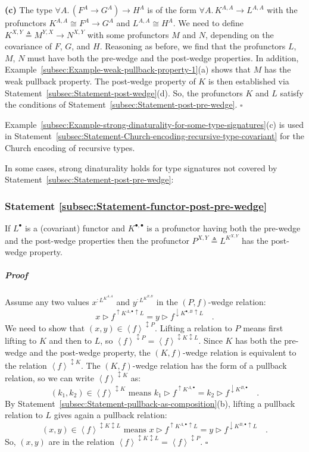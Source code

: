 \textbf{(c)} The type $\forall A.\,(F^{A}\rightarrow G^{A})\rightarrow H^{A}$
is of the form $\forall A.\,K^{A,A}\rightarrow L^{A,A}$ with the
profunctors $K^{A,A}\cong F^{A}\rightarrow G^{A}$ and $L^{A,A}\cong H^{A}$.
We need to define $K^{X,Y}\triangleq M^{Y,X}\rightarrow N^{X,Y}$
with some profunctors $M$ and $N$, depending on the covariance of
$F$, $G$, and $H$. Reasoning as before, we find that the profunctors
$L$, $M$, $N$ must have both the pre-wedge and the post-wedge properties.
In addition, Example~\ref{subsec:Example-weak-pullback-property-1}(a)
shows that $M$ has the weak pullback property. The post-wedge property
of $K$ is then established via Statement~\ref{subsec:Statement-post-wedge}(d).
So, the profunctors $K$ and $L$ satisfy the conditions of Statement~\ref{subsec:Statement-post-pre-wedge}.
$\square$

Example~\ref{subsec:Example-strong-dinaturality-for-some-type-signatures}(c)
is used in Statement~\ref{subsec:Statement-Church-encoding-recursive-type-covariant}
for the Church encoding of recursive types.

In some cases, strong dinaturality holds for type signatures not covered
by Statement~\ref{subsec:Statement-post-pre-wedge}:

\subsubsection{Statement \label{subsec:Statement-functor-post-pre-wedge}\ref{subsec:Statement-functor-post-pre-wedge}}

If $L^{\bullet}$ is a (covariant) functor and $K^{\bullet,\bullet}$
is a profunctor having both the pre-wedge and the post-wedge properties
then the profunctor $P^{X,Y}\triangleq L^{K^{X,Y}}$ has the post-wedge
property.

\subparagraph{Proof}

Assume any two values $x^{:L^{K^{A,A}}}$ and $y^{:L^{K^{B,B}}}$
in the $\left(P,f\right)$-wedge relation:
\[
x\triangleright f^{\uparrow K^{A,\bullet}\uparrow L}=y\triangleright f^{\downarrow K^{\bullet,B}\uparrow L}\quad.
\]
We need to show that $\left(x,y\right)\in\left<f\right>^{\updownarrow P}$.
Lifting a relation to $P$ means first lifting to $K$ and then to
$L$, so $\left<f\right>^{\updownarrow P}=\left<f\right>^{\updownarrow K\updownarrow L}$.
Since $K$ has both the pre-wedge and the post-wedge property, the
$\left(K,f\right)$-wedge relation is equivalent to the relation $\left<f\right>^{\updownarrow K}$.
The $\left(K,f\right)$-wedge relation has the form of a pullback
relation, so we can write $\left<f\right>^{\updownarrow K}$ as:
\[
(k_{1},k_{2})\in\left<f\right>^{\updownarrow K}\text{ means }k_{1}\triangleright f^{\uparrow K^{A,\bullet}}=k_{2}\triangleright f^{\downarrow K^{B,\bullet}}\quad.
\]
By Statement~\ref{subsec:Statement-pullback-as-composition}(b),
lifting a pullback relation to $L$ gives again a pullback relation:
\[
\left(x,y\right)\in\left<f\right>^{\updownarrow K\updownarrow L}\text{ means }x\triangleright f^{\uparrow K^{A,\bullet}\uparrow L}=y\triangleright f^{\downarrow K^{B,\bullet}\uparrow L}\quad.
\]
So, $\left(x,y\right)$ are in the relation $\left<f\right>^{\updownarrow K\updownarrow L}=\left<f\right>^{\updownarrow P}$.
$\square$


